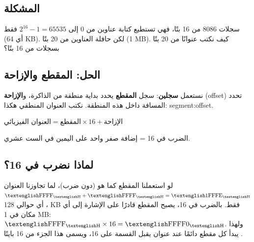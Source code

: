 \subsection{المشكلة}
سجلات \textenglish{8086} من 16 بتًا، فهي تستطيع كتابة عناوين من 0 إلى $2^{16} - 1 = 65535$ فقط
(أي \textenglish{64 KB}). لكن حافلة العناوين من 20 بتًا (\textenglish{1 MB}). كيف نكتب عنوانًا من 20 بتًا
بسجلات من 16 بتًا؟

\subsection{الحل: المقطع والإزاحة}
نستعمل \textbf{سجلين}: سجل \textbf{المقطع} يحدد بداية منطقة من الذاكرة، و\textbf{الإزاحة}
\textenglish{(offset)} تحدد المسافة داخل هذه المنطقة. نكتب العنوان المنطقي هكذا:
\textenglish{segment:offset}.

\begin{tarif}
    \centering
    $\text{العنوان الفيزيائي} = \text{المقطع} \times 16 + \text{الإزاحة}$
    \par\small
    الضرب في 16 = إضافة صفر واحد على اليمين في الست عشري.
\end{tarif}

\begin{khatwa}[: العنوان الفيزيائي لـ \textenglish{CS = 1000H} و\textenglish{IP = 0234H}]
\end{khatwa}

\subsection{لماذا نضرب في 16؟}
لو استعملنا المقطع كما هو (دون ضرب)، لما تجاوزنا العنوان $\hex{FFFF} + \hex{FFFF} = \hex{1FFFE}$، أي
حوالي \textenglish{128 KB} فقط. بالضرب في 16، يصبح المقطع قادرًا على الإشارة إلى أي مكان في \textenglish{1 MB}:
$\hex{FFFF} \times 16 = \hex{FFFF0}$. ولهذا يبدأ كل مقطع دائمًا عند عنوان يقبل القسمة على 16، ويسمى
هذا الجزء من 16 بايتًا .

